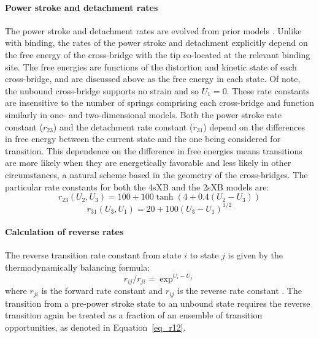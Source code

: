 \documentclass[10pt]{article}
\newcommand{\citep}[1]{\cite{#1}} %
\begin{document}
\paragraph{Power stroke and detachment rates} %
The power stroke and detachment rates are evolved from prior models \citep{Pate1989, Tanner2007}.
Unlike with binding, the rates of the power stroke and detachment explicitly depend on the free energy of the cross-bridge with the tip co-located at the relevant binding site. 
The free energies are functions of the distortion and kinetic state of each cross-bridge, and are discussed above as the free energy in each state.
Of note, the unbound cross-bridge supports no strain and so $U_1 = 0$.
These rate constants are insensitive to the number of springs comprising each cross-bridge and function similarly in one- and two-dimensional models. 
Both the power stroke rate constant ($r_{23}$) and the detachment rate constant ($r_{31}$) depend on the differences in free energy between the current state and the one being considered for transition.  
This dependence on the difference in free energies means transitions are more likely when they are energetically favorable and less likely in other circumstances, a natural scheme based in the geometry of the cross-bridges.
The particular rate constants for both the 4sXB and the 2sXB models are: 
\begin{equation}
    r_{23}(U_2, U_3) = 100 + 100\tanh(4 + 0.4 (U_2 - U_3)) 
    \label{eq_r23}
\end{equation}
\begin{equation}
    r_{31}(U_3, U_1) = 20 + 100 (U_3 - U_1)^{1/2}
    \label{eq_r31}
\end{equation}

\paragraph{Calculation of reverse rates} %
The reverse transition rate constant from state $i$ to state $j$ is given by the thermodynamically balancing formula: 
\begin{equation}
    r_{ij}/r_{ji}=\exp^{U_i-U_j}
    \label{eq_reverse}
\end{equation}
where $r_{ji}$ is the forward rate constant and $r_{ij}$ is the reverse rate constant \citep{Pate1989, Daniel1998, Tanner2007}.
The transition from a pre-power stroke state to an unbound state requires the reverse transition again be treated as a fraction of an ensemble of transition opportunities, as denoted in Equation~\ref{eq_r12}. 
\end{document}
